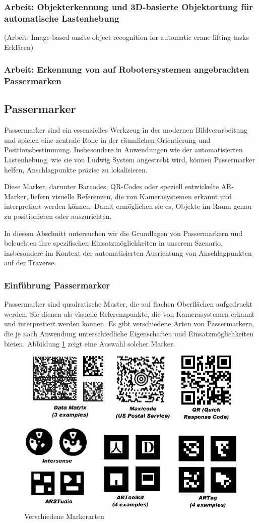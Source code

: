 \subsubsection{Arbeit: Objekterkennung und 3D-basierte Objektortung für automatische Lastenhebung}
(Arbeit: Image-based onsite object recognition for automatic crane lifting tasks\cite{zhou_image-based_2021} Erklären)

\subsubsection{Arbeit: Erkennung von auf Robotersystemen angebrachten Passermarken}

\clearpage
\subsection{Passermarker}
Passermarker sind ein essenzielles Werkzeug in der modernen Bildverarbeitung und spielen eine 
zentrale Rolle in der räumlichen Orientierung und Positionsbestimmung. Insbesondere in Anwendungen 
wie der automatisierten Lastenhebung, wie sie von Ludwig System angestrebt wird, können Passermarker 
helfen, Anschlagpunkte präzise zu lokalisieren.

Diese Marker, darunter Barcodes, QR-Codes oder speziell entwickelte AR-Marker, liefern visuelle 
Referenzen, die von Kamerasystemen erkannt und interpretiert werden können. Damit ermöglichen sie es, 
Objekte im Raum genau zu positionieren oder auszurichten.

In diesem Abschnitt untersuchen wir die Grundlagen von Passermarkern und beleuchten ihre spezifischen 
Einsatzmöglichkeiten in unserem Szenario, insbesondere im Kontext der automatisierten Ausrichtung von 
Anschlagpunkten auf der Traverse.

\subsubsection{Einführung Passermarker}
Passermarker sind quadratische Muster, die auf flachen Oberflächen aufgedruckt werden. 
Sie dienen als visuelle Referenzpunkte, die von Kamerasystemen erkannt und interpretiert 
werden können. Es gibt verschiedene Arten von Passermarkern, die je nach Anwendung 
unterschiedliche Eigenschaften und Einsatzmöglichkeiten bieten. 
Abbildung \ref{fig:marker_types} zeigt eine Auswahl solcher Marker.

\begin{figure}[H]
    \centering
    \includegraphics[width=0.5\linewidth]{graphics/marker_arten.png}
    \caption{Verschiedene Markerarten}
    \label{fig:marker_types}
\end{figure}

